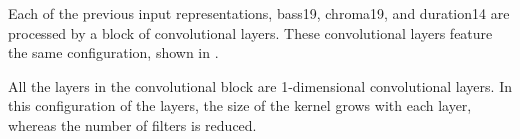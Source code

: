 

Each of the previous input representations, \gls{bass19},
\gls{chroma19}, and \gls{duration14} are processed by a
block of convolutional layers. These convolutional layers
feature the same configuration, shown in
.


All the layers in the convolutional block are 1-dimensional
convolutional layers. In this configuration of the layers,
the size of the kernel grows with each layer, whereas the
number of filters is reduced.

